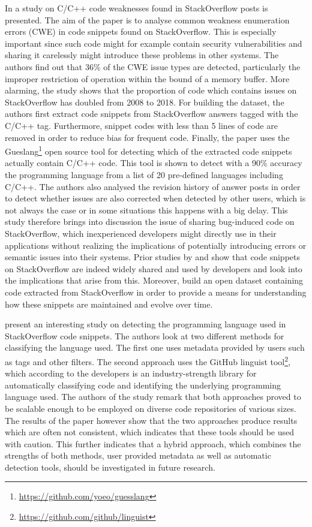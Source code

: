 In \citet{P021} a study on C/C++ code weaknesses found in StackOverflow posts is presented. The aim of the paper is to analyse common weakness enumeration errors (CWE) \cite{P993, P994} in code snippets found on StackOverflow. This is especially important since such code might for example contain security vulnerabilities and sharing it carelessly might introduce these problems in other systems. The authors find out that 36\% of the CWE issue types are detected, particularly the improper restriction of operation within the bound of a memory buffer. More alarming, the study shows that the proportion of code which contains issues on StackOverflow has doubled from 2008 to 2018. For building the dataset, the authors first extract code snippets from StackOverflow answers tagged with the C/C++ tag. Furthermore, snippet codes with less than 5 lines of code are removed in order to reduce bias for frequent code. Finally, the paper uses the Gueslang\footnote{\url{https://github.com/yoeo/guesslang}} open source tool for detecting which of the extracted code snippets actually contain C/C++ code. This tool is shown to detect with a 90\% accuracy the programming language from a list of 20 pre-defined languages including C/C++. The authors also analysed the revision history of answer posts in order to detect whether issues are also corrected when detected by other users, which is not always the case or in some situations this happens with a big delay. This study therefore brings into discussion the issue of sharing bug-induced code on StackOverflow, which inexperienced developers might directly use in their applications without realizing the implications of potentially introducing errors or semantic issues into their systems. Prior studies by \citet{P022} and \citet{P023} show that code snippets on StackOverflow are indeed widely shared and used by developers and look into the implications that arise from this. Moreover, \citet{P025} build an open dataset containing code extracted from StackOverflow in order to provide a means for understanding how these snippets are maintained and evolve over time.

\citet{P024} present an interesting study on detecting the programming language used in StackOverflow code snippets. The authors look at two different methods for classifying the language used. The first one uses metadata provided by users such as tags and other filters. The second approach uses the GitHub linguist tool\footnote{\url{https://github.com/github/linguist}}, which according to the developers is an industry-strength library for automatically classifying code and identifying the underlying programming language used. The authors of the study remark that both approaches proved to be scalable enough to be employed on diverse code repositories of various sizes. The results of the paper however show that the two approaches produce results which are often not consistent, which indicates that these tools should be used with caution. This further indicates that a hybrid approach, which combines the strengths of both methods, user provided metadata as well as automatic detection tools, should be investigated in future research.


